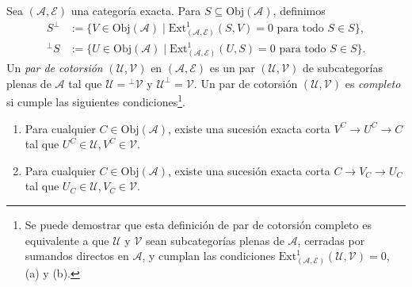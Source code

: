 \documentclass[tesis]{subfiles}
\begin{document}
\begin{Def}\cite[Definition 5.1]{Stovicek}\label{Def: Pares de cotorsión en categorías exactas}
    Sea $(\mathscr{A},\mathscr{E})$ una categoría exacta. Para $S\subseteq\text{Obj}(\mathscr{A})$, definimos
    \begin{align*}
        S^\perp &:= \{V\in\text{Obj}(\mathscr{A}) \mid \text{Ext}_{(\mathscr{A},\mathscr{E})}^1(S,V) = 0 \text{ para todo } S\in S \}, \\
        {}^\perp S &:= \{U\in\text{Obj}(\mathscr{A}) \mid \text{Ext}_{(\mathscr{A},\mathscr{E})}^1(U,S) = 0 \text{ para todo } S\in S \}.
    \end{align*} 
    Un \emph{par de cotorsión} $(\mathcal{U},\mathcal{V})$ en $(\mathscr{A},\mathscr{E})$ es un par $(\mathcal{U},\mathcal{V})$ de subcategorías plenas de $\mathscr{A}$ tal que $\mathcal{U} = {}^\perp \mathcal{V}$ y $\mathcal{U}^\perp = \mathcal{V}$. Un par de cotorsión $(\mathcal{U},\mathcal{V})$ es \emph{completo} si cumple las siguientes condiciones\footnote{Se puede demostrar que esta definición de par de cotorsión completo es equivalente a que $\mathcal{U}$ y $\mathcal{V}$ sean subcategorías plenas de $\mathscr{A}$, cerradas por sumandos directos en $\mathscr{A}$, y cumplan las condiciones $\text{Ext}_{(\mathscr{A},\mathscr{E})}^{1}(\mathcal{U},\mathcal{V})=0$, (a) y (b).}.

    \begin{enumerate}[label=(\alph*)]

        \item Para cualquier $C\in\text{Obj}(\mathscr{A})$, existe una sucesión exacta corta $V^C\to U^C\to C$ tal que $U^C\in\mathcal{U}, V^C\in \mathcal{V}$. 

        \item Para cualquier $C\in\text{Obj}(\mathscr{A})$, existe una sucesión exacta corta $C\to V_C\to U_C$ tal que $U_C\in\mathcal{U}, V_C\in \mathcal{V}$. 
    \end{enumerate}

\end{Def}
\end{document}
